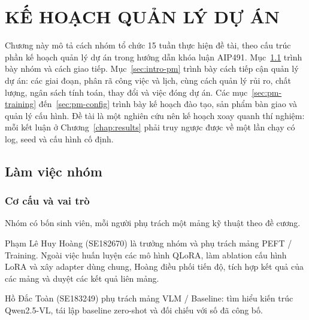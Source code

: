 
\chapter{KẾ HOẠCH QUẢN LÝ DỰ ÁN}
\label{chap:pm}

\ifpdf
    \graphicspath{{Chapter2/Figs/Raster/}{Chapter2/Figs/PDF/}{Chapter2/Figs/}}
\else
    \graphicspath{{Chapter2/Figs/Vector/}{Chapter2/Figs/}}
\fi

Chương này mô tả cách nhóm tổ chức 15 tuần thực hiện đề tài, theo cấu trúc phần kế
hoạch quản lý dự án trong hướng dẫn khóa luận AIP491. Mục~\ref{sec:intro-team} trình
bày nhóm và cách giao tiếp. Mục~\ref{sec:intro-pm} trình bày cách tiếp cận quản lý dự
án: các giai đoạn, phân rã công việc và lịch, cùng cách quản lý rủi ro, chất lượng,
ngân sách tính toán, thay đổi và việc đóng dự án. Các mục~\ref{sec:pm-training}
đến~\ref{sec:pm-config} trình bày kế hoạch đào tạo, sản phẩm bàn giao và quản lý cấu
hình. Đề tài là một nghiên cứu nên kế hoạch xoay quanh thí nghiệm: mỗi kết luận ở
Chương~\ref{chap:results} phải truy ngược được về một lần chạy có log, seed và cấu hình
cố định.

\section{Làm việc nhóm}
\label{sec:intro-team}

\subsection{Cơ cấu và vai trò}

Nhóm có bốn sinh viên, mỗi người phụ trách một mảng kỹ thuật theo đề cương.

Phạm Lê Huy Hoàng (SE182670) là trưởng nhóm và phụ trách mảng PEFT / Training.
Ngoài việc huấn luyện các mô hình QLoRA, làm ablation cấu hình LoRA và xây
adapter dùng chung, Hoàng điều phối tiến độ, tích hợp kết quả của các mảng và
duyệt các kết quả liên mảng.

Hồ Đắc Toàn (SE183249) phụ trách mảng VLM / Baseline: tìm hiểu kiến trúc
Qwen2.5-VL, tái lập baseline zero-shot và đối chiếu với số đã công bố.


